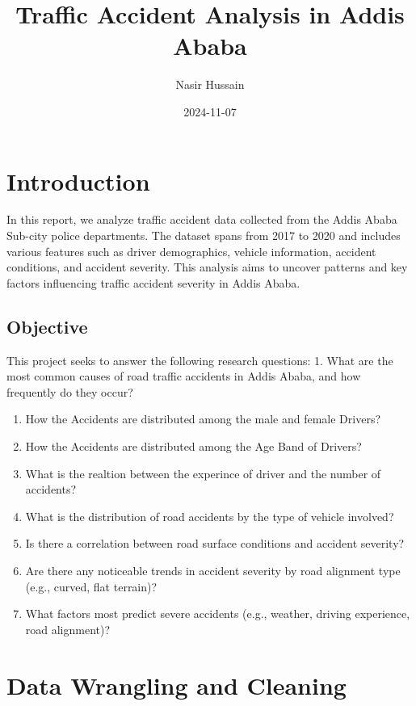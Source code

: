 \documentclass[
]{article}
\title{Traffic Accident Analysis in Addis Ababa}
\author{Nasir Hussain}
\date{2024-11-07}
\begin{document}
\maketitle

\hypertarget{introduction}{%
\section{Introduction}\label{introduction}}

In this report, we analyze traffic accident data collected from the
Addis Ababa Sub-city police departments. The dataset spans from 2017 to
2020 and includes various features such as driver demographics, vehicle
information, accident conditions, and accident severity. This analysis
aims to uncover patterns and key factors influencing traffic accident
severity in Addis Ababa.

\hypertarget{objective}{%
\subsection{Objective}\label{objective}}

This project seeks to answer the following research questions: 1. What
are the most common causes of road traffic accidents in Addis Ababa, and
how frequently do they occur?

\begin{enumerate}
\def\labelenumi{\arabic{enumi}.}
\setcounter{enumi}{1}
\item
  How the Accidents are distributed among the male and female Drivers?
\item
  How the Accidents are distributed among the Age Band of Drivers?
\item
  What is the realtion between the experince of driver and the number of
  accidents?
\item
  What is the distribution of road accidents by the type of vehicle
  involved?
\item
  Is there a correlation between road surface conditions and accident
  severity?
\item
  Are there any noticeable trends in accident severity by road alignment
  type (e.g., curved, flat terrain)?
\item
  What factors most predict severe accidents (e.g., weather, driving
  experience, road alignment)?
\end{enumerate}

\hypertarget{data-wrangling-and-cleaning}{%
\section{Data Wrangling and
Cleaning}\label{data-wrangling-and-cleaning}}
\end{document}
